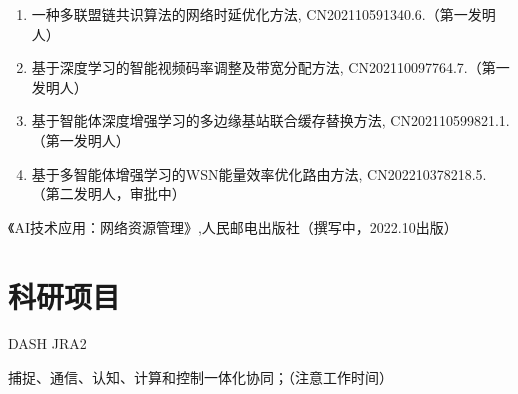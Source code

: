 \documentclass{resume}
\begin{document}
\begin{enumerate}
    \item 一种多联盟链共识算法的网络时延优化方法, CN202110591340.6.（第一发明人）
    \item 基于深度学习的智能视频码率调整及带宽分配方法, CN202110097764.7.（第一发明人）
    \item 基于智能体深度增强学习的多边缘基站联合缓存替换方法, CN202110599821.1.（第一发明人）
    \item 基于多智能体增强学习的WSN能量效率优化路由方法, CN202210378218.5.（第二发明人，审批中）
\end{enumerate}
《AI技术应用：网络资源管理》,人民邮电出版社（撰写中，2022.10出版）


\section{科研项目}
DASH JRA2

捕捉、通信、认知、计算和控制一体化协同；（注意工作时间）

\end{document}
